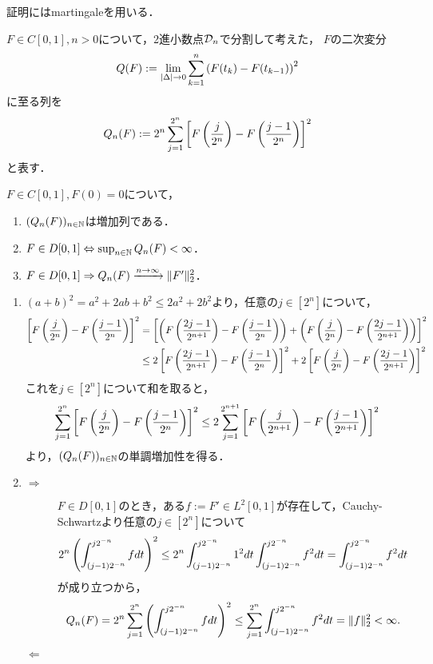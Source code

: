 \documentclass[uplatex,dvipdfmx]{jsreport}
\begin{document}
\begin{tcolorbox}[colframe=ForestGreen, colback=ForestGreen!10!white,breakable,colbacktitle=ForestGreen!40!white,coltitle=black,fonttitle=\bfseries\sffamily,
title=]
    証明にはmartingaleを用いる．
\end{tcolorbox}

\begin{notation}
    $F\in C[0,1],n>0$について，2進小数点$\mathcal{D}_n$で分割して考えた，
    $F$の二次変分
    \[Q(F):=\lim_{\lvert\Delta\rvert\to0}\sum_{k=1}^n\left(F(t_k)-F(t_{k-1})\right)^2\]
    に至る列を
    \[Q_n(F):=2^n\sum^{2^n}_{j=1}\left[F\left(\frac{j}{2^n}\right)-F\left(\frac{j-1}{2^n}\right)\right]^2\]
    と表す．
\end{notation}

\begin{lemma}
    $F\in C[0,1],F(0)=0$について，
    \begin{enumerate}
        \item $(Q_n(F))_{n\in\mathbb{N}}$は増加列である．
        \item $F\in D[0,1]\Leftrightarrow\sup_{n\in\mathbb{N}}Q_n(F)<\infty$．
        \item $F\in D[0,1]\Rightarrow Q_n(F)\xrightarrow{n\to\infty}\|F'\|^2_2$．
    \end{enumerate}
\end{lemma}
\begin{Proof}\mbox{}
    \begin{enumerate}
        \item $(a+b)^2=a^2+2ab+b^2\le 2a^2+2b^2$より，任意の$j\in[2^n]$について，
        \begin{align*}
            \left[F\left(\frac{j}{2^n}\right)-F\left(\frac{j-1}{2^n}\right)\right]^2&=\left[\left(F\left(\frac{2j-1}{2^{n+1}}\right)-F\left(\frac{j-1}{2^n}\right)\right)+\left(F\left(\frac{j}{2^n}\right)-F\left(\frac{2j-1}{2^{n+1}}\right)\right)\right]^2\\
            &\le2\left[F\left(\frac{2j-1}{2^{n+1}}\right)-F\left(\frac{j-1}{2^n}\right)\right]^2+2\left[F\left(\frac{j}{2^n}\right)-F\left(\frac{2j-1}{2^{n+1}}\right)\right]^2
        \end{align*}
        これを$j\in[2^n]$について和を取ると，
        \[\sum^{2^n}_{j=1}\left[F\left(\frac{j}{2^n}\right)-F\left(\frac{j-1}{2^n}\right)\right]^2\le 2\sum^{2^{n+1}}_{j=1}\left[F\left(\frac{j}{2^{n+1}}\right)-F\left(\frac{j-1}{2^{n+1}}\right)\right]^2\]
        より，$(Q_n(F))_{n\in\mathbb{N}}$の単調増加性を得る．
        \item \begin{description}
            \item[$\Rightarrow$] $F\in D[0,1]$のとき，ある$f:=F'\in L^2[0,1]$が存在して，Cauchy-Schwartzより任意の$j\in[2^n]$について
            \[2^n\left(\int^{j2^{-n}}_{(j-1)2^{-n}}fdt\right)^2\le 2^n\int^{j2^{-n}}_{(j-1)2^{-n}}1^2dt\int^{j2^{-n}}_{(j-1)2^{-n}}f^2dt=\int^{j2^{-n}}_{(j-1)2^{-n}}f^2dt\]
            が成り立つから，
            \[Q_n(F)=2^n\sum^{2^n}_{j=1}\left(\int^{j2^{-n}}_{(j-1)2^{-n}}fdt\right)^2\le \sum^{2^n}_{j=1}\int^{j2^{-n}}_{(j-1)2^{-n}}f^2dt=\|f\|_2^2<\infty.\]
            \item[$\Leftarrow$]

        \end{description}
    \end{enumerate}
\end{Proof}
\end{document}
